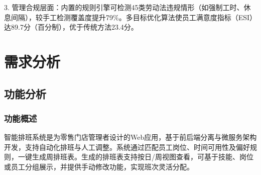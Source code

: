 \documentclass{ctexart}
\begin{document}
3.
管理合规层面：内置的规则引擎可检测45类劳动法违规情形（如强制工时、休息间隔），较手工检测覆盖度提升79\%。多目标优化算法使员工满意度指标（ESI）达89.7分（百分制），优于传统方法23.4分。

\section{需求分析}
\subsection{功能分析}
\subsubsection{功能概述}

智能排班系统是为零售门店管理者设计的Web应用，基于前后端分离与微服务架构开发，支持自动化排班与人工调整。系统通过匹配员工岗位、时间可用性及偏好规则，一键生成周排班表。生成的排班表支持按日/周视图查看，可基于技能、岗位或员工分组展示，并提供手动修改功能，实现班次灵活分配。
\end{document}

